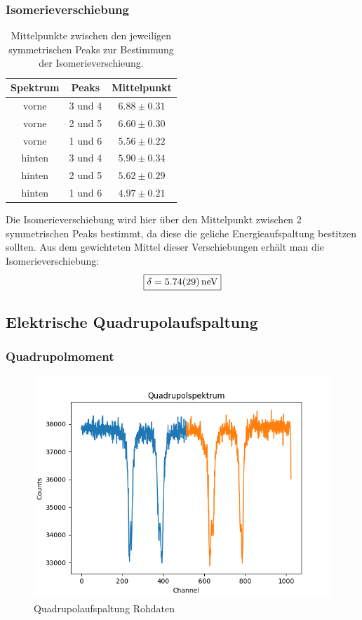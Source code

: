 \documentclass[12pt,a4paper]{article}
\begin{document}
\subsubsection{Isomerieverschiebung}
\begin{table}
\centering
\begin{tabular}{|c|c|c|}
\hline 
Spektrum & Peaks & Mittelpunkt \\ 
\hline 
vorne & 3 und 4 & $6.88\pm 0.31$ \\ 
\hline 
vorne & 2 und 5 & $6.60\pm 0.30$ \\ 
\hline 
vorne & 1 und 6 & $5.56\pm 0.22$ \\ 
\hline
\hline
hinten & 3 und 4 & $5.90\pm 0.34$ \\ 
\hline 
hinten & 2 und 5 & $5.62\pm 0.29$ \\ 
\hline 
hinten & 1 und 6 & $4.97\pm 0.21$ \\ 
\hline 
\end{tabular} 
\caption{Mittelpunkte zwischen den jeweiligen symmetrischen Peaks zur Bestimmung der Isomerieverschieung.}
\label{tab:Hyper_Iso}
\end{table}

Die Isomerieverschiebung wird hier über den Mittelpunkt zwischen 2 symmetrischen Peaks bestimmt, da diese die geliche Energieaufspaltung bestitzen sollten. Aus dem gewichteten Mittel dieser Verschiebungen erhält man die Isomerieverschiebung:
\begin{equation*}
\boxed{\delta = \SI{5.74\pm 0.29}{neV}}
\end{equation*}


\subsection{Elektrische Quadrupolaufspaltung}

\subsubsection{Quadrupolmoment}

\begin{figure}
\centering
\includegraphics[scale=0.8]{Bilder/Quadrupol/Quad_Roh.png}
\caption{Quadrupolaufspaltung Rohdaten}
\label{fig:Quad_Roh}
\end{figure}
\end{document}
